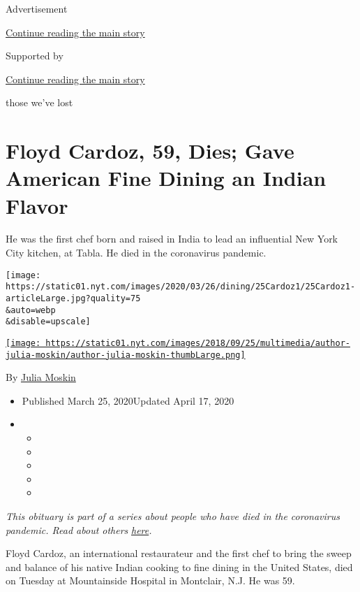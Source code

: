Advertisement

\protect\hyperlink{after-top}{Continue reading the main story}

Supported by

\protect\hyperlink{after-sponsor}{Continue reading the main story}

those we've lost

\hypertarget{floyd-cardoz-59-dies-gave-american-fine-dining-an-indian-flavor}{%
\section{Floyd Cardoz, 59, Dies; Gave American Fine Dining an Indian
Flavor}\label{floyd-cardoz-59-dies-gave-american-fine-dining-an-indian-flavor}}

He was the first chef born and raised in India to lead an influential
New York City kitchen, at Tabla. He died in the coronavirus pandemic.

\texttt{[image: https://static01.nyt.com/images/2020/03/26/dining/25Cardoz1/25Cardoz1-articleLarge.jpg?quality=75\\\&auto=webp\\\&disable=upscale]}

\href{https://www.nytimes.com/by/julia-moskin}{\texttt{[image: https://static01.nyt.com/images/2018/09/25/multimedia/author-julia-moskin/author-julia-moskin-thumbLarge.png]}}

By \href{https://www.nytimes.com/by/julia-moskin}{Julia Moskin}

\begin{itemize}
\item
  Published March 25, 2020Updated April 17, 2020
\item
  \begin{itemize}
  \item
  \item
  \item
  \item
  \item
  \end{itemize}
\end{itemize}

\emph{This obituary is part of a series about people who have died in
the coronavirus pandemic. Read about others}
\href{https://www.nytimes.com/series/people-who-have-died-of-the-coronavirus}{\emph{here}}\emph{.}

Floyd Cardoz, an international restaurateur and the first chef to bring
the sweep and balance of his native Indian cooking to fine dining in the
United States, died on Tuesday at Mountainside Hospital in Montclair,
N.J. He was 59.

